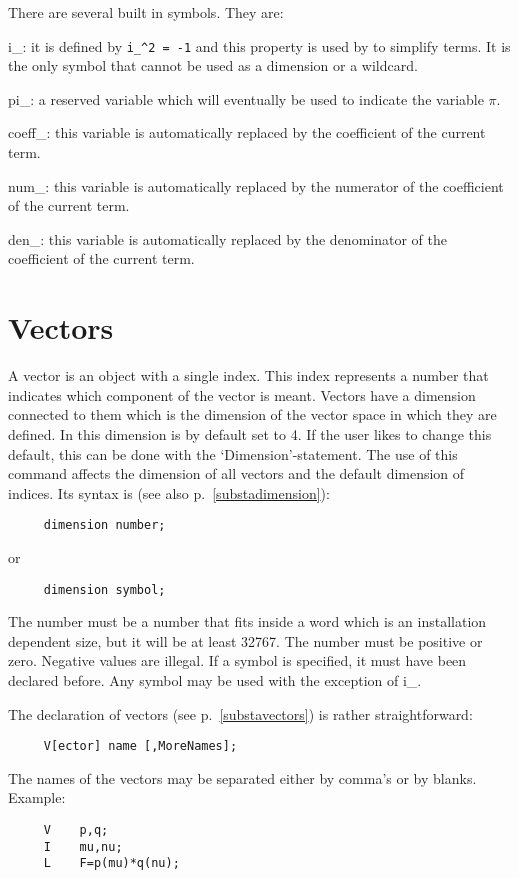 There are several built in symbols. They are:

\noindent i\_: it is defined by \verb:i_^2 = -1: and this 
property is used by {\FORM} to simplify terms. It is the only symbol that 
cannot be used as a dimension or a wildcard.

\noindent pi\_: a reserved variable which will eventually be 
used to indicate the variable $\pi$.

\noindent coeff\_: this variable is automatically replaced 
by the coefficient of the current term.

\noindent num\_: this variable is automatically replaced by 
the numerator of the coefficient of the current term.

\noindent den\_: this variable is automatically replaced by 
the denominator of the coefficient of the current term.


\section{Vectors}

\label{sect-vectors}
A vector is an object with a single index. This 
index represents a number that indicates which component of the vector is 
meant. Vectors have a dimension connected to them which is 
the dimension of the vector space in which they are defined. In {\FORM} 
this dimension is by default set to 4. If the user likes to change this 
default, this can be done with the `Dimension'-statement. The use of this 
command affects the dimension of all vectors and the default dimension of 
indices. Its syntax is (see also p.~\ref{substadimension}):
\begin{verbatim}
     dimension number;
\end{verbatim}
or
\begin{verbatim}
     dimension symbol;
\end{verbatim}
The number must be a number that fits inside a {\FORM} word which is 
an installation dependent size, but it will be at least 32767. 
The number must be positive or zero. Negative values are illegal. 
If a symbol is specified, it must have been declared before. Any symbol 
may be used with the exception of i\_. 

The declaration of vectors (see p.~\ref{substavectors}) is rather 
straightforward:
\begin{verbatim}
     V[ector] name [,MoreNames];
\end{verbatim}
The names of the vectors may be separated either by comma's or 
by blanks. Example: 
\begin{verbatim}
     V    p,q;
     I    mu,nu;
     L    F=p(mu)*q(nu);
\end{verbatim}

